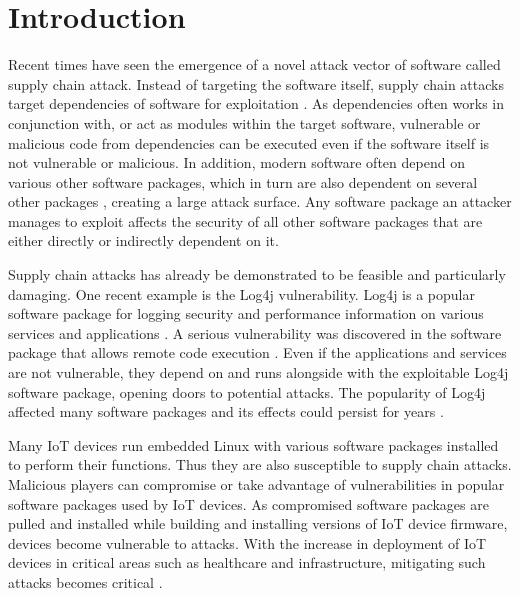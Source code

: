 \section{Introduction}

Recent times have seen the emergence of a novel attack vector of software called supply chain attack. Instead of targeting the software itself, supply chain attacks target dependencies of software for exploitation \cite{Review_of_Open_Source, Evaluating_and_Mitigating}. As dependencies often works in conjunction with, or act as modules within the target software, vulnerable or malicious code from dependencies can be executed even if the software itself is not vulnerable or malicious. In addition, modern software often depend on various other software packages, which in turn are also dependent on several other packages \cite{Evaluating_and_mitigating}, creating a large attack surface. Any software package an attacker manages to exploit affects the security of all other software packages that are either directly or indirectly dependent on it.\par
Supply chain attacks has already be demonstrated to be feasible and particularly damaging. One recent example is the Log4j vulnerability. Log4j is a popular software package for logging security and performance information on various services and applications \cite{CISA}. A serious vulnerability was discovered in the software package that allows remote code execution \cite{CISA}. Even if the applications and services are not vulnerable, they depend on and runs alongside with the exploitable Log4j software package, opening doors to potential attacks. The popularity of Log4j affected many software packages \cite{CISA_Log4j_List} and its effects could persist for years \cite{Review_of_log4j}.\par
Many IoT devices run embedded Linux with various software packages installed to perform their functions. Thus they are also susceptible to supply chain attacks. Malicious players can compromise or take advantage of vulnerabilities in popular software packages used by IoT devices. As compromised software packages are pulled and installed while building and installing versions of IoT device firmware, devices become vulnerable to attacks. With the increase in deployment of IoT devices in critical areas such as healthcare and infrastructure, mitigating such attacks becomes critical \cite{IoT_Supply_Chain_Attack_Trends}.\par 
